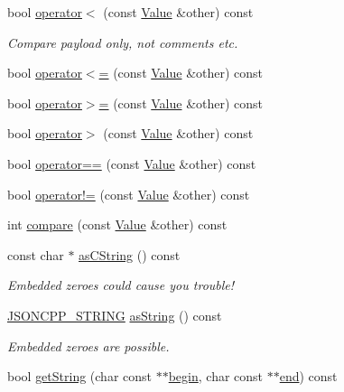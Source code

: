 \begin{DoxyCompactItemize}
\item 
bool \hyperlink{class_json_1_1_value_aac6bd14155b88ed2d39ef54820b39e49}{operator$<$} (const \hyperlink{class_json_1_1_value}{Value} \&other) const
\begin{DoxyCompactList}\small\item\em Compare payload only, not comments etc. \end{DoxyCompactList}\item 
bool \hyperlink{class_json_1_1_value_a40c411a320a416d5eac0052b36211286}{operator$<$=} (const \hyperlink{class_json_1_1_value}{Value} \&other) const
\item 
bool \hyperlink{class_json_1_1_value_afe2c3e52df60b9622cbd8358b74bdbf5}{operator$>$=} (const \hyperlink{class_json_1_1_value}{Value} \&other) const
\item 
bool \hyperlink{class_json_1_1_value_a4646c2f0764908c0972160c7c2ebe567}{operator$>$} (const \hyperlink{class_json_1_1_value}{Value} \&other) const
\item 
bool \hyperlink{class_json_1_1_value_a16f9250e30d5c4505cd11137c564a764}{operator==} (const \hyperlink{class_json_1_1_value}{Value} \&other) const
\item 
bool \hyperlink{class_json_1_1_value_a86e95be072e515c48abc61dec63a1689}{operator!=} (const \hyperlink{class_json_1_1_value}{Value} \&other) const
\item 
int \hyperlink{class_json_1_1_value_aefa4464ca1bb0bcc9a87b38ed62ca2e0}{compare} (const \hyperlink{class_json_1_1_value}{Value} \&other) const
\item 
const char $\ast$ \hyperlink{class_json_1_1_value_a16668c8db7ef0a5de040012f0dfd84b0}{as\+C\+String} () const
\begin{DoxyCompactList}\small\item\em Embedded zeroes could cause you trouble! \end{DoxyCompactList}\item 
\hyperlink{json_8h_a1e723f95759de062585bc4a8fd3fa4be}{J\+S\+O\+N\+C\+P\+P\+\_\+\+S\+T\+R\+I\+NG} \hyperlink{class_json_1_1_value_ae3f9b0d38f820ccdd8888aa92ea6e792}{as\+String} () const
\begin{DoxyCompactList}\small\item\em Embedded zeroes are possible. \end{DoxyCompactList}\item 
bool \hyperlink{class_json_1_1_value_a2e1b7be6bde2fe23f15290d9ddbbdf8a}{get\+String} (char const $\ast$$\ast$\hyperlink{class_json_1_1_value_a015459a3950c198d63a2d3be8f5ae296}{begin}, char const $\ast$$\ast$\hyperlink{class_json_1_1_value_a3e443cd0ef24f7e028b175e47ee045e0}{end}) const

\end{DoxyCompactItemize}
